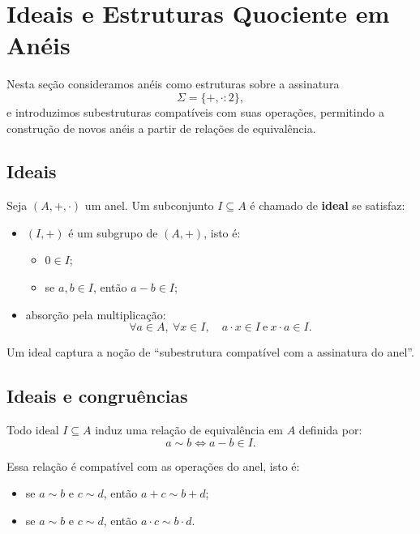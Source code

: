\documentclass[../../main]{subfiles}
\begin{document}
\section{Ideais e Estruturas Quociente em Anéis}
\label{sec:matematica:algebra:estruturas-algebricas:ideais-quocientes}

Nesta seção consideramos anéis como estruturas sobre a assinatura
\[
	\Sigma = \{+, \cdot : 2\},
\]
e introduzimos subestruturas compatíveis com suas operações, permitindo a construção de novos anéis a partir de relações de equivalência.

\subsection{Ideais}

Seja $(A,+,\cdot)$ um anel. Um subconjunto $I \subseteq A$ é chamado de \textbf{ideal} se satisfaz:

\begin{itemize}
	\item $(I,+)$ é um subgrupo de $(A,+)$, isto é:
	      \begin{itemize}
		      \item $0 \in I$;
		      \item se $a,b \in I$, então $a-b \in I$;
	      \end{itemize}

	\item absorção pela multiplicação:
	      \[
		      \forall a \in A,\ \forall x \in I,\quad a \cdot x \in I \ \text{e}\ x \cdot a \in I.
	      \]
\end{itemize}

Um ideal captura a noção de “subestrutura compatível com a assinatura do anel”.

\subsection{Ideais e congruências}

Todo ideal $I \subseteq A$ induz uma relação de equivalência em $A$ definida por:
\[
	a \sim b \iff a - b \in I.
\]

Essa relação é compatível com as operações do anel, isto é:
\begin{itemize}
	\item se $a \sim b$ e $c \sim d$, então $a+c \sim b+d$;
	\item se $a \sim b$ e $c \sim d$, então $a \cdot c \sim b \cdot d$.
\end{itemize}
\end{document}
